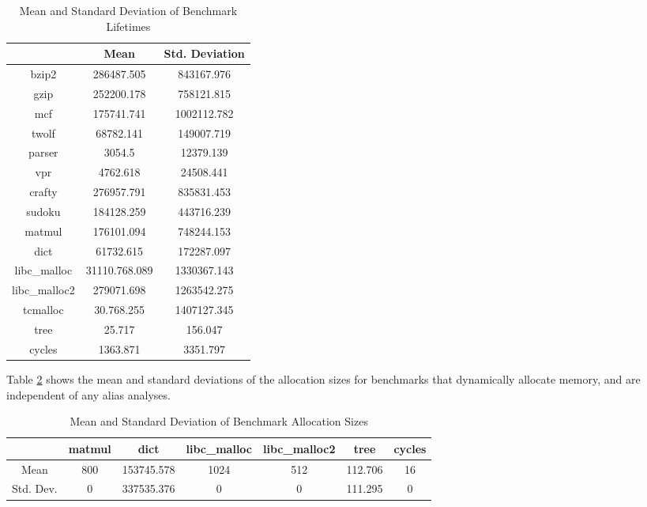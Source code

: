 \begin{table} [h!]
\centering
   \begin{tabular} {|c|c c|}
      \hline
      & Mean & Std. Deviation \\
      \hline
	   bzip2 & 286487.505 & 843167.976 \\
      \hline
	   gzip & 252200.178 & 758121.815 \\
      \hline
           mcf & 175741.741 & 1002112.782 \\
      \hline
	   twolf & 68782.141 & 149007.719 \\
      \hline
	   parser & 3054.5 & 12379.139 \\
      \hline
	   vpr & 4762.618 & 24508.441 \\
      \hline
	   crafty & 276957.791 & 835831.453 \\
      \hline
	   sudoku & 184128.259 & 443716.239 \\
      \hline
	   matmul & 176101.094 & 748244.153 \\
      \hline
	   dict & 61732.615 & 172287.097 \\
      \hline
	   libc\_malloc & 31110.768.089 & 1330367.143 \\
      \hline
	   libc\_malloc2 & 279071.698 & 1263542.275 \\
      \hline
	   tcmalloc & 30.768.255 & 1407127.345 \\
      \hline
	   tree & 25.717 & 156.047 \\
      \hline
	   cycles & 1363.871 & 3351.797 \\
      \hline
   \end{tabular}
   \caption{Mean and Standard Deviation of Benchmark Lifetimes}
   \label{table:5}
\end{table}

\newpage

Table \ref{table:6} shows the mean and standard deviations of the allocation sizes for benchmarks that dynamically allocate memory, and are independent of any alias analyses.

\begin{table} [h!]
\centering
   \begin{tabular} {|c|c c c c c c|}
      \hline
      & matmul & dict & libc\_malloc & libc\_malloc2 & tree & cycles \\
      \hline
      Mean & 800 & 153745.578 & 1024 & 512 & 112.706 & 16 \\
      \hline
      Std. Dev. & 0 & 337535.376 & 0 & 0 & 111.295 & 0 \\
      \hline
   \end{tabular}
   \caption{Mean and Standard Deviation of Benchmark Allocation Sizes}
   \label{table:6}
\end{table}

